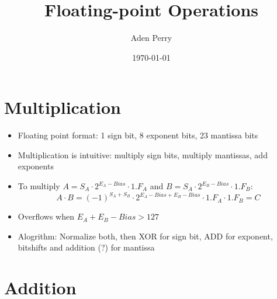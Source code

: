 \documentclass{article}
\title{Floating-point Operations}
\author{Aden Perry}
\date{\today}
\begin{document}
\maketitle

\section{Multiplication}

\begin{itemize}
    \item Floating point format: 1 sign bit, 8 exponent bits, 23 mantissa bits
    \item Multiplication is intuitive: multiply sign bits, multiply mantissas, add exponents
    \item To multiply $A = S_A \cdot 2 ^ {E_A - Bias} \cdot 1.F_A$ and $B = S_A \cdot 2 ^ {E_B - Bias} \cdot 1.F_B$:
        \begin{equation}
            A \cdot B = \left( -1 \right)^{S_A + S_B} \cdot 2 ^ {E_A - Bias + E_B - Bias} \cdot 1.F_A \cdot 1.F_B = C
        \end{equation}

    \item Overflows when $E_A + E_B - Bias > 127$

    \item Alogrithm: Normalize both, then XOR for sign bit, ADD for exponent, bitshifts and addition (?) for mantissa
        
\end{itemize}

\section{Addition}
\end{document}

